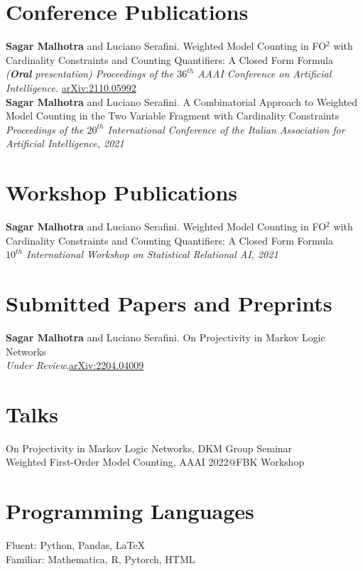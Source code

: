 \documentclass[10pt, a4paper]{article}
\newcommand{\years}[1]{\marginnote{\scriptsize #1}}
\begin{document}
\section*{Conference Publications}

\noindent
\years{2022}\textbf{Sagar Malhotra} and Luciano Serafini. Weighted Model Counting in FO$^2$ with Cardinality Constraints and Counting Quantifiers: A Closed Form Formula \\ \emph{(\textbf{Oral} presentation) Proceedings of the $36^{th}$ AAAI Conference on Artificial Intelligence.} \href{https://arxiv.org/abs/2110.05992}{arXiv:2110.05992} \\

\years{2021}\textbf{Sagar Malhotra} and Luciano Serafini. A Combinatorial Approach to Weighted Model Counting in the Two Variable Fragment with Cardinality Constraints\\ \emph{ Proceedings of the $20^{th}$ International Conference of the Italian Association for Artificial Intelligence, 2021}\\


\section*{Workshop Publications}
\noindent
\years{2021}\textbf{Sagar Malhotra} and Luciano Serafini. Weighted Model Counting in FO$^2$ with Cardinality Constraints and Counting Quantifiers: A Closed Form Formula\\ \emph{$10^{th}$ International Workshop on Statistical Relational AI, 2021}\\

\section*{Submitted Papers and Preprints}
\years{2022}\textbf{Sagar Malhotra} and Luciano Serafini. On Projectivity in Markov Logic Networks\\ \emph{Under Review}.\href{https://arxiv.org/abs/2204.04009}{arXiv:2204.04009}\\


\section*{Talks}
\noindent
\years{2022}On Projectivity in Markov Logic Networks, DKM Group Seminar \\
\years{2022}Weighted First-Order Model Counting, AAAI 2022@FBK Workshop
\section*{Programming Languages}
\noindent 
Fluent: Python, Pandas, \LaTeX\\
Familiar: Mathematica, R, Pytorch, HTML
\end{document}

